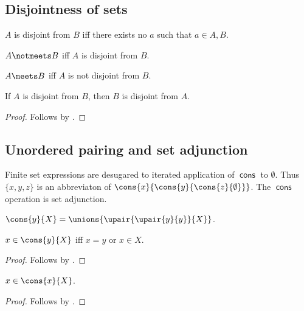 \subsection{Disjointness of sets}

\begin{definition}\label{disjoint}
    $A$ is disjoint from $B$ iff there exists no $a$ such that $a\in A, B$.
\end{definition}

\begin{abbreviation}\label{notmeets}
    $A\notmeets B$ iff $A$ is disjoint from $B$.
\end{abbreviation}

\begin{abbreviation}\label{meets}
    $A\meets B$ iff $A$ is not disjoint from $B$.
\end{abbreviation}

\begin{proposition}%
\label{disjoint_symmetric}
    If $A$ is disjoint from $B$, then $B$ is disjoint from $A$.
\end{proposition}
\begin{proof}
    Follows by .
\end{proof}





\subsection{Unordered pairing and set adjunction}

Finite set expressions are desugared to
iterated application of $\operatorname{\textsf{cons}}$ to $\emptyset$.
Thus $\{x,y,z\}$ is an abbreviaton of
$\cons{x}{\cons{y}{\cons{z}{\emptyset}}}$.
The $\operatorname{\textsf{cons}}$ operation is set adjunction.

\begin{definition}\label{cons}
    $\cons{y}{X} = \unions{\upair{\upair{y}{y}}{X}}$.
\end{definition}

\begin{proposition}\label{cons_iff}
    $x\in \cons{y}{X}$ iff $x = y$ or $x\in X$.
\end{proposition}
\begin{proof}
    Follows by .
\end{proof}

\begin{proposition}\label{cons_left}
    $x\in \cons{x}{X}$.
\end{proposition}
\begin{proof}
    Follows by .
\end{proof}

